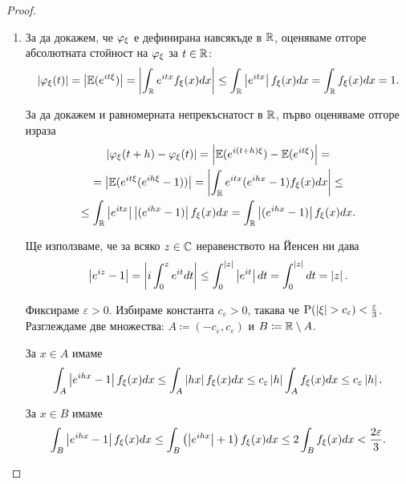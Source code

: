 \documentclass[numbers=endperiod, DIV=15, bibliography=totocnumbered]{scrartcl}
\begin{document}
\begin{proof}
  \mbox{}
  \begin{enumerate}
    \item За да докажем, че $\varphi_\xi$ е дефинирана навсякъде в $\mathbb{R}$, оценяваме отгоре абсолютната стойност на $\varphi_\xi$ за $t \in \mathbb{R}$:
    \begin{displaymath}
      \left\vert \varphi_\xi(t) \right\vert
      =
      \left\vert \mathbb{E}(e^{it\xi}) \right\vert
      =
      \left\vert \int_{\mathbb{R}} e^{itx} f_\xi(x) dx \right\vert
      \leq
      \int_{\mathbb{R}} \left\vert e^{itx} \right\vert f_\xi(x) dx
      =
      \int_{\mathbb{R}} f_\xi(x) dx
      =
      1.
    \end{displaymath}

    За да докажем и равномерната непрекъснатост в $\mathbb{R}$, първо оценяваме отгоре израза
    \begin{multline*}
      \left\vert \varphi_\xi(t + h) - \varphi_\xi(t) \right\vert
      =
      \left\vert \mathbb{E}(e^{i(t + h)\xi}) - \mathbb{E}(e^{it\xi}) \right\vert
      = \\ =
      \left\vert \mathbb{E}(e^{it\xi} (e^{ih\xi} - 1)) \right\vert
      =
      \left\vert \int_{\mathbb{R}} e^{itx} (e^{ihx} - 1) f_\xi(x) dx \right\vert
      \leq \\ \leq
      \int_{\mathbb{R}} \left\vert e^{itx} \right\vert \left\vert (e^{ihx} - 1) \right\vert f_\xi(x) dx
      =
      \int_{\mathbb{R}} \left\vert (e^{ihx} - 1) \right\vert f_\xi(x) dx.
    \end{multline*}

    Ще използваме, че за всяко $z \in \mathbb{C}$ неравенството на Йенсен ни дава
    \begin{displaymath}
      \left\vert e^{iz} - 1 \right\vert
      =
      \left\vert i \int_0^z e^{it} dt \right\vert
      \leq
      \int_0^{\left\vert z \right\vert} \left\vert e^{it} \right\vert dt
      =
      \int_0^{\left\vert z \right\vert} dt
      =
      \left\vert z \right\vert.
    \end{displaymath}

    Фиксираме $\varepsilon > 0$. Избираме константа $c_\varepsilon > 0$, такава че $\operatorname{P}(\left\vert \xi \right\vert > c_\varepsilon) < \frac \varepsilon 3$.
    Разглеждаме две множества: $A \coloneqq (-c_\varepsilon, c_\varepsilon)$ и $B \coloneqq \mathbb{R} \setminus A$.

    За $x \in A$ имаме
    \begin{displaymath}
      \int_A \left\vert e^{ihx} - 1 \right\vert f_\xi(x) dx
      \leq
      \int_A \left\vert h x \right\vert f_\xi(x) dx
      \leq
      c_\varepsilon \left\vert h \right\vert \int_A f_\xi(x) dx
      \leq
      c_\varepsilon \left\vert h \right\vert.
    \end{displaymath}

    За $x \in B$ имаме
    \begin{displaymath}
      \int_B \left\vert e^{ihx} - 1 \right\vert f_\xi(x) dx
      \leq
      \int_B \left( \left\vert e^{ihx} \right\vert + 1 \right) f_\xi(x) dx
      \leq
      2 \int_B f_\xi(x) dx
      <
      \frac {2\varepsilon} 3.
    \end{displaymath}


\end{enumerate}
\end{proof}
\end{document}
